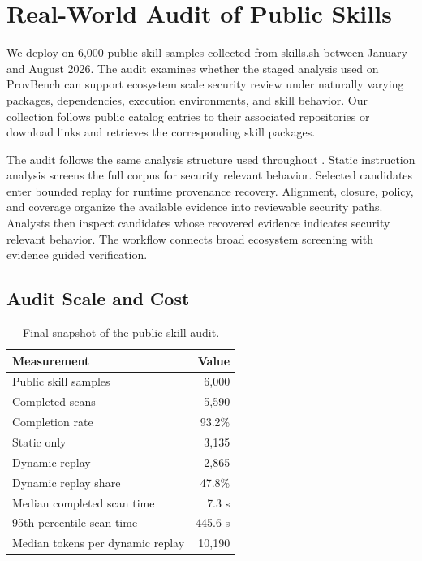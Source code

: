 \section{Real-World Audit of Public Skills}
\label{sec:realworld-audit}

We deploy \system on 6,000 public skill samples collected from skills.sh
between January and August 2026. The audit examines whether the staged analysis
used on ProvBench can support ecosystem scale security review under naturally
varying packages, dependencies, execution environments, and skill behavior.
Our collection follows public catalog entries to their associated repositories
or download links and retrieves the corresponding skill packages.

The audit follows the same analysis structure used throughout \system.
Static instruction analysis screens the full corpus for security relevant
behavior. Selected candidates enter bounded replay for runtime provenance
recovery. Alignment, closure, policy, and coverage organize the available
evidence into reviewable security paths. Analysts then inspect candidates whose
recovered evidence indicates security relevant behavior. The workflow connects
broad ecosystem screening with evidence guided verification.


\subsection{Audit Scale and Cost}
\label{sec:realworld-scale}

\begin{table}[t]
\caption{Final snapshot of the public skill audit.}
\label{tab:realworld-summary}
\centering
\small
\setlength{\tabcolsep}{4.5pt}
\renewcommand{\arraystretch}{1.10}
\begin{tabular*}{\columnwidth}{@{\extracolsep{\fill}}lr}
\toprule
\textbf{Measurement} & \textbf{Value} \\
\midrule
Public skill samples               & 6,000 \\
Completed scans                    & 5,590 \\
Completion rate                    & 93.2\% \\
Static only                        & 3,135 \\
Dynamic replay                     & 2,865 \\
Dynamic replay share               & 47.8\% \\
Median completed scan time         & 7.3 s \\
95th percentile scan time          & 445.6 s \\
Median tokens per dynamic replay   & 10,190 \\
\bottomrule
\end{tabular*}
\end{table}

